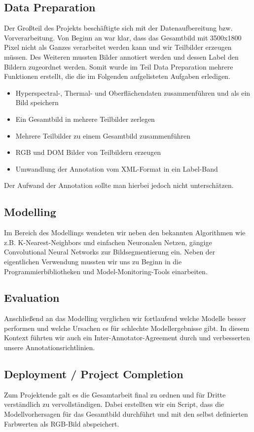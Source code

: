 \subsection{Data Preparation}
Der Großteil des Projekts beschäftigte sich mit der Datenaufbereitung bzw. Vorverarbeitung.
Von Beginn an war klar, dass das Gesamtbild mit 3500x1800 Pixel nicht als Ganzes verarbeitet werden kann und wir Teilbilder erzeugen müssen.
Des Weiteren mussten Bilder annotiert werden und dessen Label den Bildern zugeordnet werden.
Somit wurde im Teil Data Preparation mehrere Funktionen erstellt, die die im Folgenden aufgelisteten Aufgaben erledigen.

\begin{itemize}
    \item Hyperspectral-, Thermal- und Oberflächendaten zusammenführen und als ein Bild speichern
    \item Ein Gesamtbild in mehrere Teilbilder zerlegen
    \item Mehrere Teilbilder zu einem Gesamtbild zusammenführen
    \item RGB und DOM Bilder von Teilbildern erzeugen
    \item Umwandlung der Annotation vom XML-Format in ein Label-Band
\end{itemize}

Der Aufwand der Annotation sollte man hierbei jedoch nicht unterschätzen.

\subsection{Modelling}
Im Bereich des Modellings wendeten wir neben den bekannten Algorithmen wie z.B. K-Nearest-Neighbors und
einfachen Neuronalen Netzen, gängige Convolutional Neural Networks zur Bildsegmentierung ein.
Neben der eigentlichen Verwendung mussten wir uns zu Beginn in die Programmierbibliotheken und Model-Monitoring-Tools einarbeiten.

\subsection{Evaluation}
Anschließend an das Modelling verglichen wir fortlaufend welche Modelle besser performen und welche Ursachen es für
schlechte Modellergebnisse gibt. In diesem Kontext führten wir auch ein Inter-Annotator-Agreement durch und
verbesserten unsere Annotationsrichtlinien.

\subsection{Deployment / Project Completion}
Zum Projektende galt es die Gesamtarbeit final zu ordnen und für Dritte verständlich zu vervollständigen.
Dabei erstellten wir ein Script, dass die Modellvorhersagen für das Gesamtbild durchführt und mit den selbst
definierten Farbwerten als RGB-Bild abspeichert.


